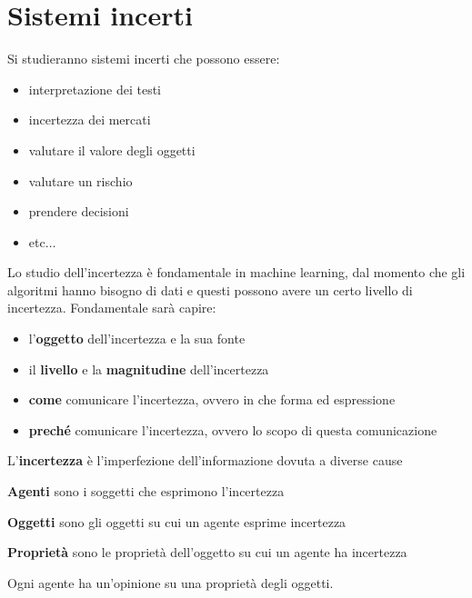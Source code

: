 \chapter{Sistemi incerti}
Si studieranno sistemi incerti che possono essere:
\begin{itemize}
    \item interpretazione dei testi
    \item incertezza dei mercati
    \item valutare il valore degli oggetti
    \item valutare un rischio
    \item prendere decisioni
    \item etc$\dots$
\end{itemize}

Lo studio dell'incertezza è fondamentale in machine learning, dal momento che 
gli algoritmi hanno bisogno di dati e questi possono avere un certo livello di 
incertezza. Fondamentale sarà capire:
\begin{itemize}
    \item l'\textbf{oggetto} dell'incertezza e la sua fonte
    \item il \textbf{livello} e la \textbf{magnitudine} dell'incertezza
    \item \textbf{come} comunicare l'incertezza, ovvero in che forma ed espressione
    \item \textbf{preché} comunicare l'incertezza, ovvero lo scopo di questa comunicazione
\end{itemize}

\begin{definizione}
    L'\textbf{incertezza}  è l'imperfezione dell'informazione dovuta a diverse cause
\end{definizione}
\begin{definizione}
    \textbf{Agenti} sono i soggetti che esprimono l'incertezza
\end{definizione}
\begin{definizione}
    \textbf{Oggetti} sono gli oggetti su cui un agente esprime incertezza
\end{definizione}
\begin{definizione}
    \textbf{Proprietà} sono le proprietà dell'oggetto su cui un agente ha incertezza
\end{definizione}
Ogni agente ha un'opinione su una proprietà degli oggetti.

